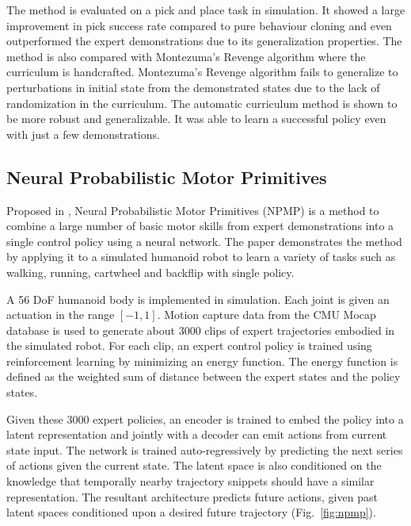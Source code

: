 \documentclass[conference]{IEEEtran}
\begin{document}
The method is evaluated on a pick and place task in simulation. It showed a large improvement in pick success rate compared to pure behaviour cloning and even outperformed the expert demonstrations due to its generalization properties. The method is also compared with Montezuma’s Revenge algorithm \cite{salimansLearningMontezumaRevenge2018} where the curriculum is handcrafted. Montezuma’s Revenge algorithm fails to generalize to perturbations in initial state from the demonstrated states due to the lack of randomization in the curriculum. The automatic curriculum method is shown to be more robust and generalizable. It was able to learn a successful policy even with just a few demonstrations.

\subsection{Neural Probabilistic Motor Primitives}

Proposed in \cite{merelNeuralProbabilisticMotor2019}, Neural Probabilistic Motor Primitives (NPMP) is a method to combine a large number of basic motor skills from expert demonstrations into a single control policy using a neural network. The paper demonstrates the method by applying it to a simulated humanoid robot to learn a variety of tasks such as walking, running, cartwheel and backflip with single policy.

A 56 DoF humanoid body is implemented in simulation. Each joint is given an actuation in the range \([-1, 1]\). Motion capture data from the CMU Mocap database\cite{CarnegieMellonUniversity} is used to generate about 3000 clips of expert trajectories embodied in the simulated robot. For each clip, an expert control policy is trained using reinforcement learning by minimizing an energy function. The energy function is defined as the weighted sum of distance between the expert states and the policy states.

Given these 3000 expert policies, an encoder is trained to embed the policy into a latent representation and jointly with a decoder can emit actions from current state input. The network is trained auto-regressively by predicting the next series of actions given the current state. The latent space is also conditioned on the knowledge that temporally nearby trajectory snippets should have a similar representation. The resultant architecture predicts future actions, given past latent spaces conditioned upon a desired future trajectory (Fig.~\ref{fig:npmp}).
\end{document}
